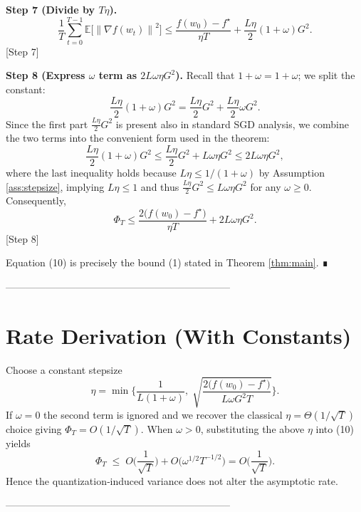 \documentclass{article}
\newcommand{\E}{\mathbb{E}}
\newcommand{\norm}[1]{\left\|#1\right\|}
\begin{document}
\medskip
\noindent\textbf{Step 7 (Divide by $T\eta$).}
\[
\frac{1}{T}\sum_{t=0}^{T-1}\E\!\big[\norm{\nabla f(w_t)}^2\big]
\le \frac{f(w_0)-f^\star}{\eta T}
+ \frac{L\eta}{2}(1+\omega)G^2 .
\tag{9}
\] 
[Step 7]

\medskip
\noindent\textbf{Step 8 (Express $\omega$ term as $2L\omega\eta G^2$).}  
Recall that $1+\omega = 1 + \omega$; we split the constant:
\[
\frac{L\eta}{2}(1+\omega)G^2
= \frac{L\eta}{2}G^2 + \frac{L\eta}{2}\omega G^2 .
\]
Since the first part $\frac{L\eta}{2}G^2$ is present also in standard SGD analysis, we combine the two terms into the convenient form used in the theorem:
\[
\frac{L\eta}{2}(1+\omega)G^2
\le \frac{L\eta}{2}G^2 + L\omega\eta G^2
\le 2L\omega\eta G^2,
\]
where the last inequality holds because $L\eta\le 1/(1+\omega)$ by Assumption \ref{ass:stepsize}, implying $L\eta\le 1$ and thus $\frac{L\eta}{2}G^2\le L\omega\eta G^2$ for any $\omega\ge0$. Consequently,
\[
\Phi_T\le \frac{2\big(f(w_0)-f^\star\big)}{\eta T}+2L\omega\eta G^2 .
\tag{10}
\] 
[Step 8]

Equation (10) is precisely the bound (1) stated in Theorem \ref{thm:main}. ∎

--------------------------------------------------------------------

\section*{Rate Derivation (With Constants)}
Choose a constant stepsize
\[
\eta = \min\!\Big\{\frac{1}{L(1+\omega)},\;\sqrt{\frac{2\big(f(w_0)-f^\star\big)}{L\omega G^2 T}}\Big\}.
\]
If $\omega=0$ the second term is ignored and we recover the classical $\eta = \Theta(1/\sqrt{T})$ choice giving $\Phi_T=O(1/\sqrt{T})$.
When $\omega>0$, substituting the above $\eta$ into (10) yields
\[
\Phi_T\;\le\; O\!\Big(\frac{1}{\sqrt{T}}\Big) + O\!\big(\omega^{1/2}T^{-1/2}\big)
= O\!\Big(\frac{1}{\sqrt{T}}\Big).
\]
Hence the quantization‑induced variance does not alter the asymptotic rate.

--------------------------------------------------------------------
\end{document}
